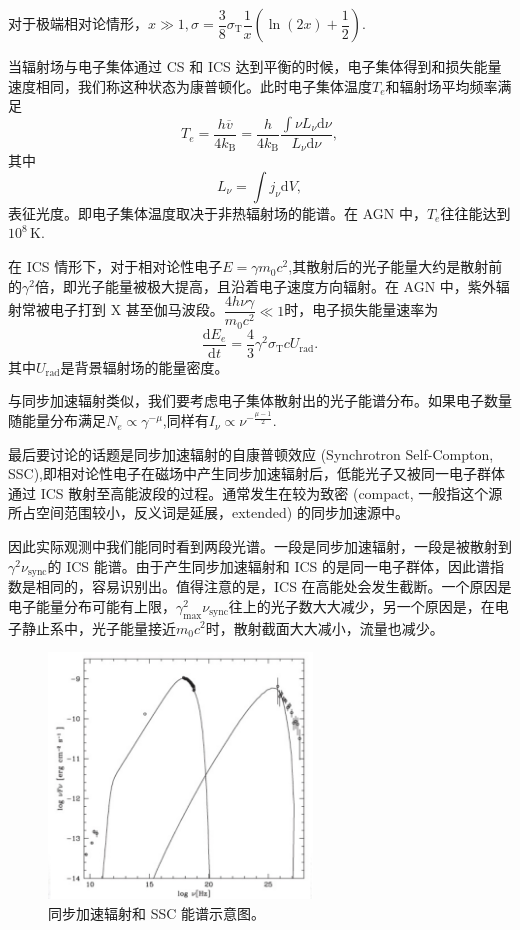 \documentclass[../天体物理基础.tex]{subfiles}
\begin{document}
对于极端相对论情形，$x\gg1,\sigma=\dfrac{3}{8}\sigma_{\text{T}}\dfrac{1}{x}\left(\ln\left(2x\right)+\dfrac{1}{2}\right)$.

当辐射场与电子集体通过 CS 和 ICS 达到平衡的时候，电子集体得到和损失能量速度相同，我们称这种状态为康普顿化。此时电子集体温度$T_{e}$和辐射场平均频率满足
\begin{equation}
T_{e}=\frac{h\overline{v}}{4k_{\text{B}}}=\frac{h}{4k_{\text{B}}}\frac{\int\nu L_{\nu}\mathrm{d}\nu}{L_{\nu}\mathrm{d}\nu},
\end{equation}
其中
\begin{equation}
L_{\nu}=\int j_{\nu}\mathrm{d}V,
\end{equation}
表征光度。即电子集体温度取决于非热辐射场的能谱。在 AGN 中，$T_{e}$往往能达到$10^{8}\,\mathrm{K}$.

在 ICS 情形下，对于相对论性电子$E=\gamma m_{0}c^{2}$,其散射后的光子能量大约是散射前的$\gamma^{2}$倍，即光子能量被极大提高，且沿着电子速度方向辐射。在 AGN 中，紫外辐射常被电子打到 X 甚至伽马波段。$\dfrac{4h\nu\gamma}{m_{0}c^{2}}\ll1$时，电子损失能量速率为
\begin{equation}
\frac{\mathrm{d}E_{e}}{\mathrm{d}t}=\frac{4}{3}\gamma^{2}\sigma_{\text{T}}cU_{\text{rad}}.\label{1.2.48}
\end{equation}
其中$U_{\text{rad}}$是背景辐射场的能量密度。

与同步加速辐射类似，我们要考虑电子集体散射出的光子能谱分布。如果电子数量随能量分布满足$N_{e}\propto{}\gamma^{-\mu}$,同样有$I_{\nu}\propto{}\nu^{-\frac{\mu-1}{2}}$.

最后要讨论的话题是同步加速辐射的自康普顿效应 (Synchrotron Self-Compton, SSC),即相对论性电子在磁场中产生同步加速辐射后，低能光子又被同一电子群体通过 ICS 散射至高能波段的过程。通常发生在较为致密 (compact, 一般指这个源所占空间范围较小，反义词是延展，extended) 的同步加速源中。

因此实际观测中我们能同时看到两段光谱。一段是同步加速辐射，一段是被散射到$\gamma^{2}\nu_{\text{sync}}$的 ICS 能谱。由于产生同步加速辐射和 ICS 的是同一电子群体，因此谱指数是相同的，容易识别出。值得注意的是，ICS 在高能处会发生截断。一个原因是电子能量分布可能有上限，$\gamma_{\max}^{2}\nu_{\text{sync}}$往上的光子数大大减少，另一个原因是，在电子静止系中，光子能量接近$m_{0}c^{2}$时，散射截面大大减小，流量也减少。

\begin{figure}[!htbp]
\centering
\includegraphics[width=7cm]{figures/figure1_9.png}
\captionsetup{justification=raggedright, singlelinecheck=false}
\caption{同步加速辐射和 SSC 能谱示意图。}
\label{同步加速辐射和 SSC 能谱示意图。}
\end{figure}
\end{document}
